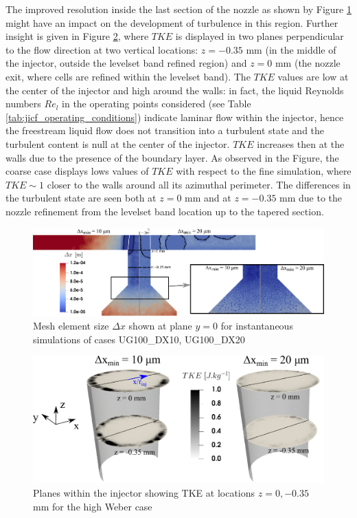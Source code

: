 The improved resolution inside the last section of the nozzle as shown by Figure \ref{fig:jicf_injector_resolution_with_mesh} might have an impact on the development of turbulence in this region. Further insight is given in Figure \ref{fig:jicf_nozzle_disks}, where $TKE$ is displayed in two planes perpendicular to the flow direction at two vertical locations: $z = -0.35$ mm (in the middle of the injector, outside the levelset band refined region) and $z = 0$ mm (the nozzle exit, where cells are refined within the levelset band). The $TKE$ values are low at the center of the injector and high around the walls: in fact, the liquid Reynolds numbers $Re_l$ in the operating points considered (see Table \ref{tab:jicf_operating_conditions}) indicate laminar flow within the injector, hence the freestream liquid flow does not transition into a turbulent state and the turbulent content is null at the center of the injector. $TKE$ increases then at the walls due to the presence of the boundary layer. As observed in the Figure, the coarse case displays lows values of $TKE$ with respect to the fine simulation, where $TKE \sim 1$ closer to the walls around all its azimuthal perimeter. The differences in the turbulent state are seen both at $z = 0$ mm and at $z = -0.35$ mm due to the nozzle refinement from the levelset band location up to the tapered section.

\clearpage

\begin{figure}[ht]
	\centering
   \includegraphics[scale=0.28]{./part2_developments/figures_ch5_resolved_JICF/instabilities_resolution/injector_resolution_with_mesh}
   \caption{Mesh element size $\Delta x$ shown at plane $y = 0$ for instantaneous simulations of cases UG100\_DX10, UG100\_DX20}
   \label{fig:jicf_injector_resolution_with_mesh}
\end{figure}

\begin{figure}[ht]
	\centering
   \includegraphics[scale=0.5]{./part2_developments/figures_ch5_resolved_JICF/instabilities_resolution/injector_visualization_disks}
   \caption{Planes within the injector showing TKE at locations $z = 0, -0.35$ mm for the high Weber case}
   \label{fig:jicf_nozzle_disks}
\end{figure}



